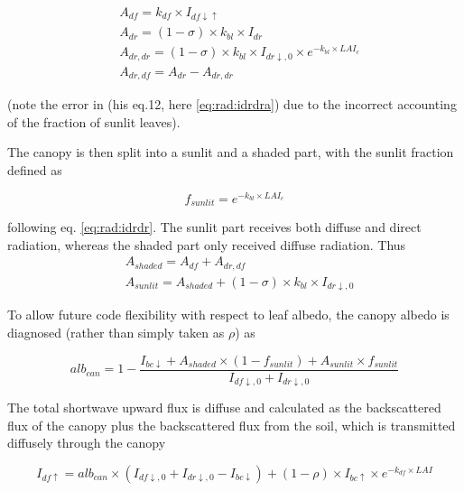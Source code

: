 \begin{subequations}\label{eq:rad:canopy_absorbed_radiation_components}
\begin{align}
&A_{df} = k_{df} \times I_{df \downarrow \uparrow}\\
&A_{dr} = (1-\sigma) \times k_{bl} \times I_{dr}\\
&A_{dr,dr} = (1-\sigma) \times k_{bl} \times I_{dr \downarrow,0} \times e^{-k_{bl}\times LAI_c}\label{eq:rad:idrdra}\\
&A_{dr,df} = A_{dr} - A_{dr,dr}
\end{align} 
\end{subequations} 

(note the error in \cite{Spitters:1986tv} (his eq.12, here \ref{eq:rad:idrdra}) due to the incorrect accounting of the fraction of sunlit leaves).

The canopy is then split into a sunlit and a shaded part, with the sunlit fraction defined as 

\begin{equation}
f_{sunlit} = e^{-k_{bl}\times LAI_c}
\end{equation}

following eq. \ref{eq:rad:idrdr}. The sunlit part receives both diffuse and direct radiation, whereas the shaded part only received diffuse radiation. Thus
\begin{subequations}\label{eq:rad:a_shadesunlit}
\begin{align}
&A_{shaded} = A_{df} + A_{dr,df}\\
&A_{sunlit} = A_{shaded} + (1-\sigma) \times k_{bl} \times I_{dr \downarrow,0} 
\end{align} 
\end{subequations} 

To allow future code flexibility with respect to leaf albedo, the canopy albedo is diagnosed (rather than simply taken as $\rho$) as 

\begin{equation}\label{eq:rad:canopy_albedo}
alb_{can} = 1 - \frac{I_{bc \downarrow} + A_{shaded} \times (1-f_{sunlit})+A_{sunlit}\times f_{sunlit}}{I_{df\downarrow,0}+I_{dr \downarrow, 0}}
\end{equation}

The total shortwave upward flux is diffuse and calculated as the backscattered flux of the canopy plus the backscattered flux from the soil, which is transmitted diffusely through the canopy

\begin{equation}\label{eq:rad:idfup}
I_{df \uparrow} = alb_{can} \times (I_{df\downarrow,0}+I_{dr \downarrow, 0} - I_{bc \downarrow}) + (1 - \rho) \times I_{bc \uparrow} \times e^{-k_{df}\times LAI}
\end{equation}

